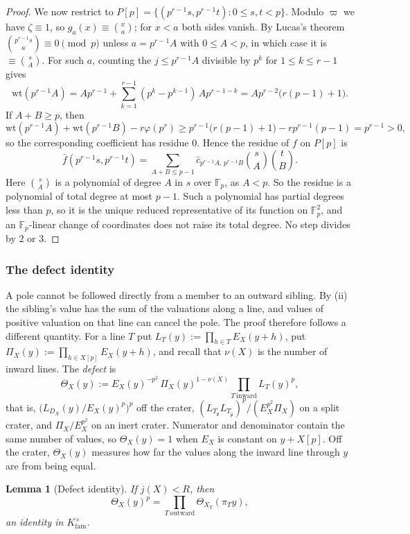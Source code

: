 \documentclass[11pt]{amsart}
\numberwithin{equation}{section}
\theoremstyle{plain}
\newtheorem{lemma}[theorem]{Lemma}
\theoremstyle{definition}
\theoremstyle{remark}
\begin{document}
\begin{proof}
We now restrict to \(P[p]=\{(p^{r-1}s,p^{r-1}t):0\le s,t<p\}\). Modulo \(\varpi\) we have \(\zeta\equiv1\), so \(g_a(x)\equiv\binom xa\); for \(x<a\) both sides vanish. By Lucas's theorem \(\binom{p^{r-1}s}{a}\equiv0\pmod p\) unless \(a=p^{r-1}A\) with \(0\le A<p\), in which case it is \(\equiv\binom sA\). For such \(a\), counting the \(j\le p^{r-1}A\) divisible by \(p^k\) for \(1\le k\le r-1\) gives
\[\mathrm{wt}(p^{r-1}A)=Ap^{r-1}+\sum_{k=1}^{r-1}(p^k-p^{k-1})\,Ap^{r-1-k}=Ap^{r-2}\bigl(r(p-1)+1\bigr).\]
If \(A+B\ge p\), then
\[\mathrm{wt}(p^{r-1}A)+\mathrm{wt}(p^{r-1}B)-r\varphi(p^r)\ge p^{r-1}\bigl(r(p-1)+1\bigr)-rp^{r-1}(p-1)=p^{r-1}>0,\]
so the corresponding coefficient has residue \(0\). Hence the residue of \(f\) on \(P[p]\) is
\[\bar f(p^{r-1}s,p^{r-1}t)=\sum_{A+B\le p-1}\bar c_{p^{r-1}A,\,p^{r-1}B}\binom sA\binom tB.\]
Here \(\binom sA\) is a polynomial of degree \(A\) in \(s\) over \(\mathbb F_p\), as \(A<p\). So the residue is a polynomial of total degree at most \(p-1\). Such a polynomial has partial degrees less than \(p\), so it is the unique reduced representative of its function on \(\mathbb F_p^2\), and an \(\mathbb F_p\)-linear change of coordinates does not raise its total degree. No step divides by \(2\) or \(3\).
\end{proof}

\subsubsection*{The defect identity}
A pole cannot be followed directly from a member to an outward sibling. By (ii) the sibling's value has the sum of the valuations along a line, and values of positive valuation on that line can cancel the pole. The proof therefore follows a different quantity. For a line \(T\) put \(L_T(y):=\prod_{h\in T}E_X(y+h)\), put \(\Pi_X(y):=\prod_{h\in X[p]}E_X(y+h)\), and recall that \(\nu(X)\) is the number of inward lines. The \emph{defect} is
\[\Theta_X(y):=E_X(y)^{-p^2}\,\Pi_X(y)^{1-\nu(X)}\prod_{T\ \text{inward}}L_T(y)^p,\]
that is, \(\bigl(L_{D_X}(y)/E_X(y)^p\bigr)^p\) off the crater, \((L_{T_{\mathfrak p}}L_{T_{\bar{\mathfrak p}}})^p/(E_X^{p^2}\Pi_X)\) on a split crater, and \(\Pi_X/E_X^{p^2}\) on an inert crater. Numerator and denominator contain the same number of values, so \(\Theta_X(y)=1\) when \(E_X\) is constant on \(y+X[p]\). Off the crater, \(\Theta_X(y)\) measures how far the values along the inward line through \(y\) are from being equal.

\begin{lemma}[Defect identity]\label{lem:defect}
If \(j(X)<R\), then
\[\Theta_X(y)^p=\prod_{T\ \text{outward}}\Theta_{X_T}(\pi_Ty),\]
an identity in \(K_{\mathrm{fam}}^\times\).
\end{lemma}
\end{document}
